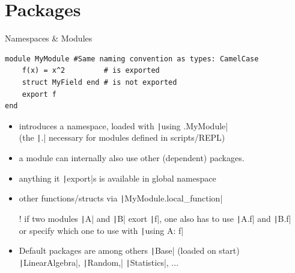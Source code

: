 \documentclass[aspectratio=169, 12pt]{beamer}
\begin{document}
    \section{Packages}
    \begin{frame}[fragile]{Namespaces \& Modules}
        \begin{verbatim}
module MyModule #Same naming convention as types: CamelCase
    f(x) = x^2         # is exported
    struct MyField end # is not exported
    export f
end
        \end{verbatim}
        \begin{itemize}[<+->]
            \item introduces a namespace, loaded with \texttt|using .MyModule|
            \\\hfill{\footnotesize (the \texttt|.| necessary for modules defined in scripts/REPL)}
            \item a module can internally also use other (dependent) packages.
            \item anything it \texttt|export|s is available in \alert{global} namespace
            \item other functions/structs via \texttt|MyModule.local_function|
            \item[!] if two modules \texttt|A| and \texttt|B| exort \texttt|f|, one also has to use
            \texttt|A.f| and \texttt|B.f|
            \\ or specify which one to use with \texttt|using A: f|
            \item Default packages are among others \texttt|Base| (loaded on start)\\
            \texttt|LinearAlgebra|,
            \texttt|Random,|
            \texttt|Statistics|, ...
        \end{itemize}
    \end{frame}
\end{document}
